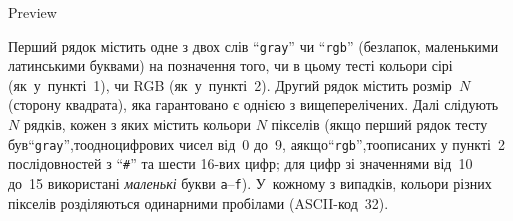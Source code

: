 {\begin{problemAllDefault}{Preview}

{

\InputFile
Перший рядок містить одне з двох слів ``\texttt{gray}'' чи ``\texttt{rgb}'' (без\nolinebreak[3] лапок, маленькими латинськими буквами) на позначення того, чи в цьому тесті кольори сірі (як~у~пункті~1), чи RGB (як~у~пункті~2).
Другий рядок містить розмір~$N$ (сторону квадрата), яка гарантовано є однією з вищеперелічених.
Далі слідують $N$ рядків, кожен з яких містить кольори $N$ пікселів (якщо перший рядок тесту був\nolinebreak[2] ``\texttt{gray}'',\linebreak[2] то\nolinebreak[2] одно\-цифро\-вих чисел від~0 до~9, а\nolinebreak[3] якщо\nolinebreak[3] ``\texttt{rgb}'',\linebreak[2] то\nolinebreak[2] описаних у пункті~2 послідовностей з ``\verb"#"'' та шести \mbox{16-вих} цифр; для цифр зі значеннями від~10 до~15 використані \emph{маленькі} букви \mbox{\texttt{a}--\texttt{f}}). У~кожному з випадків, кольори різних пікселів розділяються одинарними пробілами (ASCII-код~32).

}
\end{problemAllDefault}}
